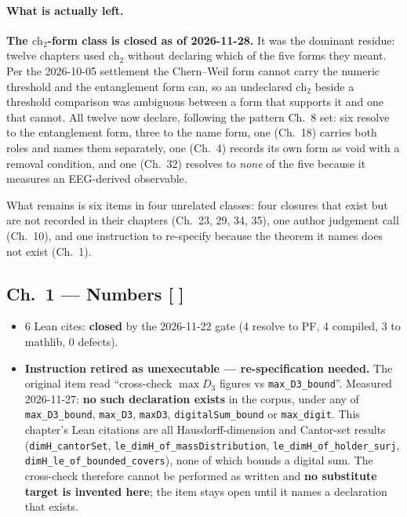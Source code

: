 \paragraph{What is actually left.}
\textbf{The $\mathrm{ch}_2$-form class is closed as of 2026-11-28.} It was the
dominant residue: twelve chapters used $\mathrm{ch}_2$ without declaring which of
the five forms they meant. Per the 2026-10-05 settlement the Chern--Weil form cannot carry the
numeric threshold and the entanglement form can, so an undeclared
$\mathrm{ch}_2$ beside a threshold comparison was ambiguous between a form that
supports it and one that cannot. All twelve now declare, following the pattern
Ch.~8 set: six resolve to the entanglement form, three to the name form, one
(Ch.~18) carries both roles and names them separately, one (Ch.~4) records its
own form as void with a removal condition, and one (Ch.~32) resolves to
\emph{none} of the five because it measures an EEG-derived observable.

\noindent What remains is six items in four unrelated classes: four closures
that exist but are not recorded in their chapters (Ch.~23, 29, 34, 35), one
author judgement call (Ch.~10), and one instruction to re-specify because the
theorem it names does not exist (Ch.~1).

\subsection*{Ch.~1 --- Numbers \hfill [\,\,]}
\begin{itemize}
\item 6 Lean cites: \textbf{closed} by the 2026-11-22 gate (4 resolve to PF, 4
compiled, 3 to mathlib, 0 defects).
\item \textbf{Instruction retired as unexecutable --- re-specification needed.}
The original item read ``cross-check $\max D_3$ figures vs
\texttt{max\_D3\_bound}''. Measured 2026-11-27: \textbf{no such declaration
exists} in the corpus, under any of \texttt{max\_D3\_bound}, \texttt{max\_D3},
\texttt{maxD3}, \texttt{digitalSum\_bound} or \texttt{max\_digit}. This
chapter's Lean citations are all Hausdorff-dimension and Cantor-set results
(\texttt{dimH\_cantorSet}, \texttt{le\_dimH\_of\_massDistribution},
\texttt{le\_dimH\_of\_holder\_surj}, \texttt{dimH\_le\_of\_bounded\_covers}),
none of which bounds a digital sum. The cross-check therefore cannot be
performed as written and \textbf{no substitute target is invented here}; the
item stays open until it names a declaration that exists.
\end{itemize}

